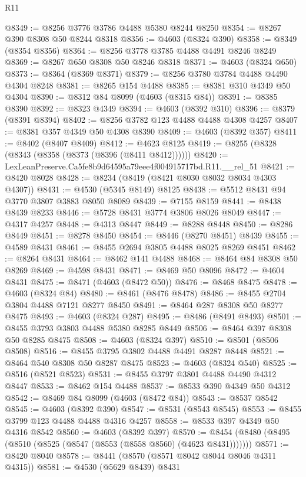 \begin{lexlean}{R11}
\begin{coremodule}
@8349 := @8256 @3776 @3786 @4488 @5380 @8244 @8250
@8354 := @8267 @390 @8308 @50 @8244 @8318
@8356 := @4603 (@8324 @390)
@8358 := @8349 (@8354 @8356)
@8364 := @8256 @3778 @3785 @4488 @4491 @8246 @8249
@8369 := @8267 @650 @8308 @50 @8246 @8318
@8371 := @4603 (@8324 @650)
@8373 := @8364 (@8369 @8371)
@8379 := @8256 @3780 @3784 @4488 @4490 @4304 @8248
@8381 := @8265 @154 @4488
@8385 := @8381 @310 @4349 @50 @4304
@8390 := @8312 @84 @8099 (@4603 (@8315 @84))
@8391 := @8385 @8390
@8392 := @8323 @4349
@8394 := @4603 (@8392 @310)
@8396 := @8379 (@8391 @8394)
@8402 := @8256 @3782 @123 @4488 @4488 @4308 @4257
@8407 := @8381 @357 @4349 @50 @4308 @8390
@8409 := @4603 (@8392 @357)
@8411 := @8402 (@8407 @8409)
@8412 := @4623 @8125
@8419 := @8255 (@8328 (@8343 (@8358 (@8373 (@8396 (@8411 @8412))))))
@8420 := LexLeanPreserve.Ca5fe8b9d64595a79eee4f004915717bd.R11.__rel_51
@8421 := @8420 @8028
@8428 := @8234 (@8419 (@8421 @8030 @8032 @8034 @4303 @4307))
@8431 := @4530 (@5345 @8149) @8125
@8438 := @5512 @8431 @94 @3770 @3807 @3883 @8050 @8089
@8439 := @7155 @8159
@8441 := @8438 @8439 @8233
@8446 := @5728 @8431 @3774 @3806 @8026 @8049
@8447 := @4317 @4257
@8448 := @4313 @8447
@8449 := @8288 @8448
@8450 := @8286 @8449
@8451 := @8278 @8450
@8454 := @8446 (@8270 @8451) @8439
@8455 := @4589 @8431
@8461 := @8455 @2694 @3805 @4488 @8025 @8269 @8451
@8462 := @8264 @8431
@8464 := @8462 @141 @4488
@8468 := @8464 @84 @8308 @50 @8269
@8469 := @4598 @8431
@8471 := @8469 @50 @8096
@8472 := @4604 @8431
@8475 := @8471 (@4603 (@8472 @50))
@8476 := @8468 @8475
@8478 := @4603 (@8324 @84)
@8480 := @8461 (@8476 @8478)
@8486 := @8455 @2704 @3804 @4488 @7121 @8277 @8450
@8491 := @8464 @287 @8308 @50 @8277 @8475
@8493 := @4603 (@8324 @287)
@8495 := @8486 (@8491 @8493)
@8501 := @8455 @3793 @3803 @4488 @5380 @8285 @8449
@8506 := @8464 @397 @8308 @50 @8285 @8475
@8508 := @4603 (@8324 @397)
@8510 := @8501 (@8506 @8508)
@8516 := @8455 @3795 @3802 @4488 @4491 @8287 @8448
@8521 := @8464 @540 @8308 @50 @8287 @8475
@8523 := @4603 (@8324 @540)
@8525 := @8516 (@8521 @8523)
@8531 := @8455 @3797 @3801 @4488 @4490 @4312 @8447
@8533 := @8462 @154 @4488
@8537 := @8533 @390 @4349 @50 @4312
@8542 := @8469 @84 @8099 (@4603 (@8472 @84))
@8543 := @8537 @8542
@8545 := @4603 (@8392 @390)
@8547 := @8531 (@8543 @8545)
@8553 := @8455 @3799 @123 @4488 @4488 @4316 @4257
@8558 := @8533 @397 @4349 @50 @4316 @8542
@8560 := @4603 (@8392 @397)
@8570 := @8454 (@8480 (@8495 (@8510 (@8525 (@8547 (@8553 (@8558 @8560) (@4623 @8431)))))))
@8571 := @8420 @8040
@8578 := @8441 (@8570 (@8571 @8042 @8044 @8046 @4311 @4315))
@8581 := @4530 (@5629 @8439) @8431

\end{coremodule}
\end{lexlean}
